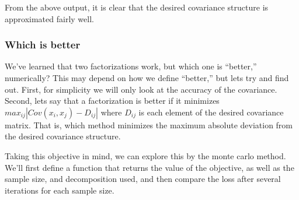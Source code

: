 \documentclass[
]{article}
\begin{document}
\hfill\break

From the above output, it is clear that the desired covariance structure
is approximated fairly well.

\hfill\break

\hypertarget{which-is-better}{%
\subsubsection{Which is better}\label{which-is-better}}

We've learned that two factorizations work, but which one is ``better,''
numerically? This may depend on how we define ``better,'' but lets try
and find out. First, for simplicity we will only look at the accuracy of
the covariance. Second, lets say that a factorization is better if it
minimizes \(max_{ij} |Cov(x_{i}, x_{j}) - D_{ij}|\) where \(D_{ij}\) is
each element of the desired covariance matrix. That is, which method
minimizes the maximum absolute deviation from the desired covariance
structure.

Taking this objective in mind, we can explore this by the monte carlo
method. We'll first define a function that returns the value of the
objective, as well as the sample size, and decomposition used, and then
compare the loss after several iterations for each sample size.
\end{document}
